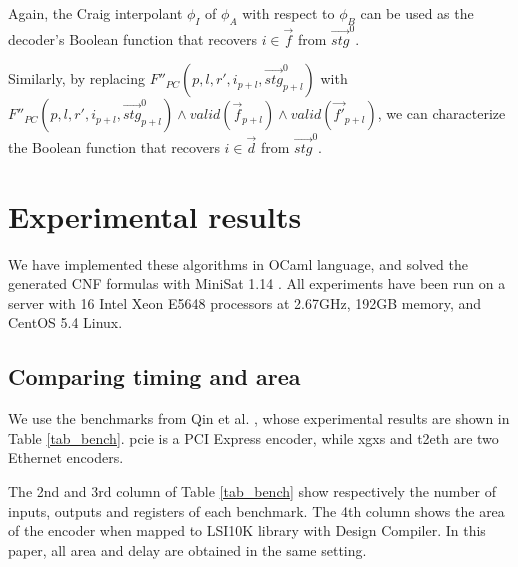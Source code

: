 \documentclass[conference]{IEEEtran}
\begin{document}
Again,
the Craig interpolant $\phi_I$ of $\phi_A$ with respect to $\phi_B$ 
can be used as the decoder's Boolean function that recovers $i\in\vec{f}$ from $\vec{stg}^0$.

Similarly,
by replacing $F''_{PC}(p,l,r',i_{p+l},\vec{stg}^0_{p+l})$ with $F''_{PC}(p,l,r',i_{p+l},\vec{stg}^0_{p+l})\wedge valid(\vec{f}_{p+l})\wedge valid(\vec{f'}_{p+l})$,
we can characterize the Boolean function that recovers $i\in\vec{d}$ from $\vec{stg}^0$.



\section{Experimental results}\label{sec_exp}
We have implemented these algorithms in OCaml language,
and solved the generated CNF formulas with MiniSat 1.14 \cite{EXTSAT}.
All experiments have been run on a server with 16 Intel Xeon E5648 processors at 2.67GHz, 
192GB memory, and CentOS 5.4 Linux.


\subsection{Comparing timing and area}
We use the benchmarks from Qin et al. \cite{QinTODAES15},
whose experimental results are shown in Table \ref{tab_bench}.
pcie is a PCI Express \cite{pcie} encoder,
while xgxs and t2eth are two Ethernet \cite{IEEE8023_S4} encoders.

The 2nd and 3rd column of Table \ref{tab_bench} show respectively the number of inputs, outputs and registers of each benchmark.
The 4th column shows the area of the encoder when mapped to LSI10K library with Design Compiler.
In this paper, 
all area and delay are obtained in the same setting.
\end{document}
